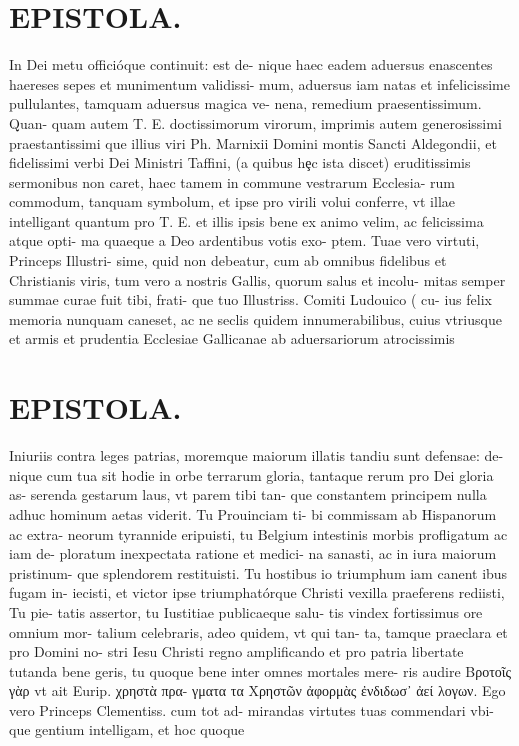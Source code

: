 \documentclass{article}
\begin{document}
\begin{pages}
\section*{EPISTOLA. }In Dei metu officióque continuit: est de- nique haec eadem aduersus enascentes haereses sepes et munimentum validissi- mum, aduersus iam natas et infelicissime pullulantes, tamquam aduersus magica ve- nena, remedium praesentissimum. Quan- quam autem T. E. doctissimorum virorum, imprimis autem generosissimi praestantissimi que illius viri Ph. Marnixii Domini montis Sancti Aldegondii, et fidelissimi verbi Dei Ministri Taffini, (a quibus hȩc ista discet) eruditissimis sermonibus non caret, haec tamem in commune vestrarum Ecclesia- rum commodum, tanquam symbolum, et ipse pro virili volui conferre, vt illae intelligant quantum pro T. E. et illis ipsis bene ex animo velim, ac felicissima atque opti- ma quaeque a Deo ardentibus votis exo- ptem. Tuae vero virtuti, Princeps Illustri- sime, quid non debeatur, cum ab omnibus fidelibus et Christianis viris, tum vero a nostris Gallis, quorum salus et incolu- mitas semper summae curae fuit tibi, frati- que tuo Illustriss. Comiti Ludouico ( cu- ius felix memoria nunquam caneset, ac ne seclis quidem innumerabilibus, cuius vtriusque et armis et prudentia Ecclesiae Gallicanae ab aduersariorum atrocissimis 
\section*{EPISTOLA. }Iniuriis contra leges patrias, moremque maiorum illatis tandiu sunt defensae: de- nique cum tua sit hodie in orbe terrarum gloria, tantaque rerum pro Dei gloria as- serenda gestarum laus, vt parem tibi tan- que constantem principem nulla adhuc hominum aetas viderit. Tu Prouinciam ti- bi commissam ab Hispanorum ac extra- neorum tyrannide eripuisti, tu Belgium intestinis morbis profligatum ac iam de- ploratum inexpectata ratione et medici- na sanasti, ac in iura maiorum pristinum- que splendorem restituisti. Tu hostibus io triumphum iam canent ibus fugam in- iecisti, et victor ipse triumphatórque Christi vexilla praeferens rediisti, Tu pie- tatis assertor, tu Iustitiae publicaeque salu- tis vindex fortissimus ore omnium mor- talium celebraris, adeo quidem, vt qui tan- ta, tamque praeclara et pro Domini no- stri Iesu Christi regno amplificando et pro patria libertate tutanda bene geris, tu quoque bene inter omnes mortales mere- ris audire Βροτοῖς γὰρ vt ait Eurip. χρηστὰ πρα- γματα τα Χρηστῶν ἀφορμὰς ἐνδιδωσ᾽ ἀεί λογων. Ego vero Princeps Clementiss. cum tot ad- mirandas virtutes tuas commendari vbi- que gentium intelligam, et hoc quoque 

\end{pages}
\end{document}
